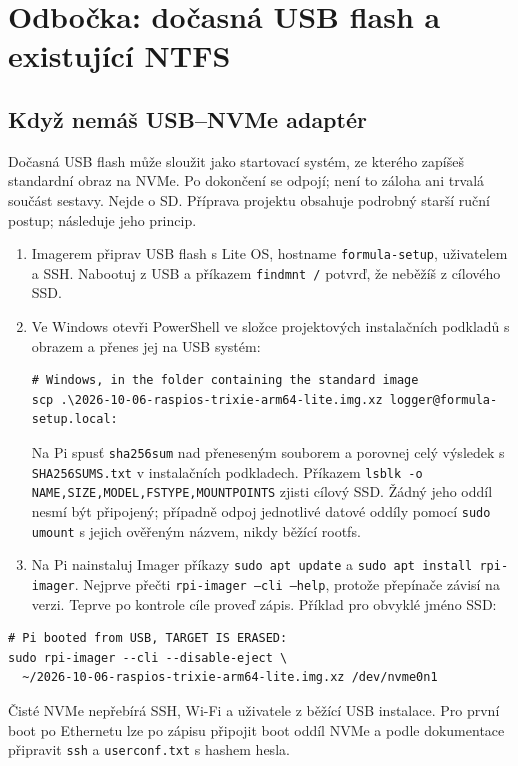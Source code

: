 \documentclass[11pt,a4paper]{article}
\begin{document}
\clearpage
\section{Odbočka: dočasná USB flash a existující NTFS}
\subsection{Když nemáš USB--NVMe adaptér}
Dočasná USB flash může sloužit jako startovací systém, ze kterého zapíšeš standardní obraz na NVMe. Po dokončení se odpojí; není to záloha ani trvalá součást sestavy. Nejde o SD. Příprava projektu obsahuje podrobný starší ruční postup; následuje jeho princip.\cite{instalace,pi-hat}
\begin{enumerate}
\item Imagerem připrav USB flash s Lite OS, hostname \texttt{formula-setup}, uživatelem a SSH. Nabootuj z USB a příkazem \texttt{findmnt /} potvrď, že neběžíš z cílového SSD.
\item Ve Windows otevři PowerShell ve složce projektových instalačních podkladů s obrazem a přenes jej na USB systém:
\begin{lstlisting}
# Windows, in the folder containing the standard image
scp .\2026-10-06-raspios-trixie-arm64-lite.img.xz logger@formula-setup.local:
\end{lstlisting}
Na Pi spusť \texttt{sha256sum} nad přeneseným souborem a porovnej celý výsledek s \texttt{SHA256SUMS.txt} v instalačních podkladech. Příkazem \texttt{lsblk -o NAME,SIZE,MODEL,FSTYPE,MOUNTPOINTS} zjisti cílový SSD. Žádný jeho oddíl nesmí být připojený; případně odpoj jednotlivé datové oddíly pomocí \texttt{sudo umount} s jejich ověřeným názvem, nikdy běžící rootfs.
\item Na Pi nainstaluj Imager příkazy \texttt{sudo apt update} a \texttt{sudo apt install rpi-imager}. Nejprve přečti \texttt{rpi-imager --cli --help}, protože přepínače závisí na verzi. Teprve po kontrole cíle proveď zápis. Příklad pro obvyklé jméno SSD:
\end{enumerate}
\begin{lstlisting}
# Pi booted from USB, TARGET IS ERASED:
sudo rpi-imager --cli --disable-eject \
  ~/2026-10-06-raspios-trixie-arm64-lite.img.xz /dev/nvme0n1
\end{lstlisting}
Čisté NVMe nepřebírá SSH, Wi-Fi a uživatele z běžící USB instalace. Pro první boot po Ethernetu lze po zápisu připojit boot oddíl NVMe a podle dokumentace připravit \texttt{ssh} a \texttt{userconf.txt} s hashem hesla.\cite{pi-remote}
\end{document}
